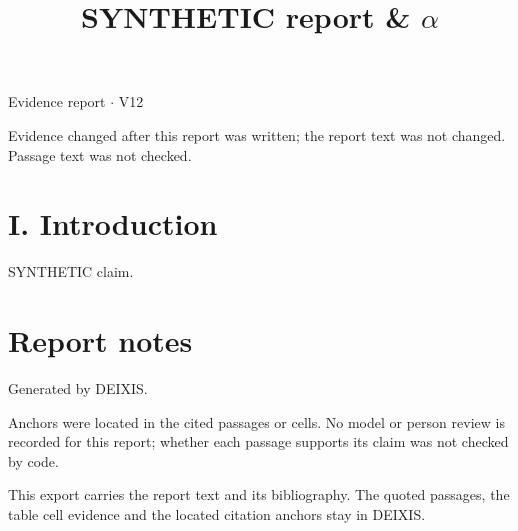 \documentclass[journal]{IEEEtran}
\begin{document}
\title{SYNTHETIC report \& \ensuremath{\alpha}}

\maketitle

\noindent Evidence report \ensuremath{\cdot} V12

\noindent Evidence changed after this report was written; the report text was not changed. Passage text was not checked.

\section*{I. Introduction}

SYNTHETIC claim. \cite{Synth26}

\section*{Report notes}

Generated by DEIXIS.

Anchors were located in the cited passages or cells. No model or person review is recorded for this report; whether each passage supports its claim was not checked by code.

This export carries the report text and its bibliography. The quoted passages, the table cell evidence and the located citation anchors stay in DEIXIS.




\end{document}
